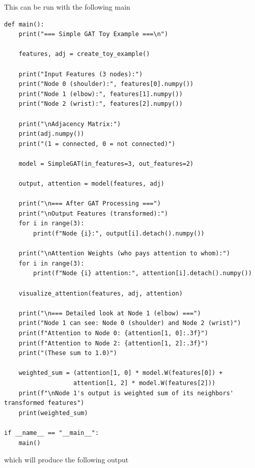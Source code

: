 This can be run with the following main

\begin{lstlisting}[style=pythonstyle,title={Toy GAT main},label={code:toy_gat_main}]
def main():
    print("=== Simple GAT Toy Example ===\n")
    
    features, adj = create_toy_example()
    
    print("Input Features (3 nodes):")
    print("Node 0 (shoulder):", features[0].numpy())
    print("Node 1 (elbow):", features[1].numpy())
    print("Node 2 (wrist):", features[2].numpy())
    
    print("\nAdjacency Matrix:")
    print(adj.numpy())
    print("(1 = connected, 0 = not connected)")
    
    model = SimpleGAT(in_features=3, out_features=2)
    
    output, attention = model(features, adj)
    
    print("\n=== After GAT Processing ===")
    print("\nOutput Features (transformed):")
    for i in range(3):
        print(f"Node {i}:", output[i].detach().numpy())
    
    print("\nAttention Weights (who pays attention to whom):")
    for i in range(3):
        print(f"Node {i} attention:", attention[i].detach().numpy())
    
    visualize_attention(features, adj, attention)
    
    print("\n=== Detailed look at Node 1 (elbow) ===")
    print("Node 1 can see: Node 0 (shoulder) and Node 2 (wrist)")
    print(f"Attention to Node 0: {attention[1, 0]:.3f}")
    print(f"Attention to Node 2: {attention[1, 2]:.3f}")
    print("(These sum to 1.0)")
    
    weighted_sum = (attention[1, 0] * model.W(features[0]) + 
                   attention[1, 2] * model.W(features[2]))
    print(f"\nNode 1's output is weighted sum of its neighbors' transformed features")
    print(weighted_sum)

if __name__ == "__main__":
    main()
\end{lstlisting}

which will produce the following output

